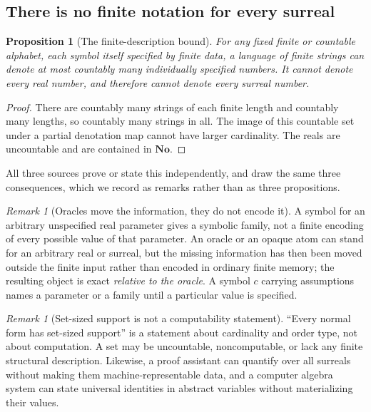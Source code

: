 \documentclass[11pt,letterpaper]{article}
\numberwithin{equation}{section}
\newtheorem{proposition}[theorem]{Proposition}
\theoremstyle{definition}
\theoremstyle{remark}
\newtheorem{remark}[theorem]{Remark}
\newcommand{\No}{\mathbf{No}}
\begin{document}
\subsection{There is no finite notation for every surreal}
\label{cas:sub-countable}
\begin{proposition}[The finite-description bound]\label{cas:prop-countable}
For any fixed finite or countable alphabet, each symbol itself specified by
finite data, a language of finite strings can denote at most countably many
individually specified numbers. It cannot denote every real number, and
therefore cannot denote every surreal number.
\end{proposition}
\begin{proof}
There are countably many strings of each finite length and countably many
lengths, so countably many strings in all. The image of this countable set under
a partial denotation map cannot have larger cardinality. The reals are
uncountable and are contained in $\No$.
\end{proof}

All three sources prove or state this independently, and draw the same three
consequences, which we record as remarks rather than as three propositions.

\begin{remark}[Oracles move the information, they do not encode it]
\label{cas:rem-oracle}
A symbol for an arbitrary unspecified real parameter gives a symbolic family,
not a finite encoding of every possible value of that parameter. An oracle or an
opaque atom can stand for an arbitrary real or surreal, but the missing
information has then been moved outside the finite input rather than encoded in
ordinary finite memory; the resulting object is exact \emph{relative to the
oracle}. A symbol $c$ carrying assumptions names a parameter or a family until a
particular value is specified.
\end{remark}

\begin{remark}[Set-sized support is not a computability statement]
\label{cas:rem-setsized}
``Every normal form has set-sized support'' is a statement about cardinality and
order type, not about computation. A set may be uncountable, noncomputable, or
lack any finite structural description. Likewise, a proof assistant can quantify
over all surreals without making them machine-representable data, and a computer
algebra system can state universal identities in abstract variables without
materializing their values.
\end{remark}
\end{document}
